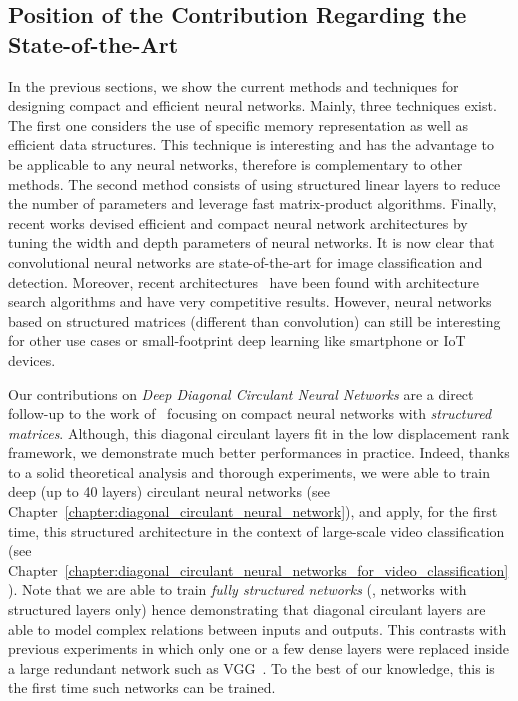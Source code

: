 \subsection{Position of the Contribution Regarding the State-of-the-Art}
\label{subsection:ch3-position_of_the_contribution_regarding_the_state-of-the-art_1}

In the previous sections, we show the current methods and techniques for designing compact and efficient neural networks. 
Mainly, three techniques exist.
The first one considers the use of specific memory representation as well as efficient data structures.
This technique is interesting and has the advantage to be applicable to any neural networks, therefore is complementary to other methods.
The second method consists of using structured linear layers to reduce the number of parameters and leverage fast matrix-product algorithms. 
Finally, recent works devised efficient and compact neural network architectures by tuning the width and depth parameters of neural networks.
It is now clear that convolutional neural networks are state-of-the-art for image classification and detection.
Moreover, recent architectures~\cite{tan2019efficientnet} have been found with architecture search algorithms and have very competitive results. 
However, neural networks based on structured matrices (different than convolution) can still be interesting for other use cases or small-footprint deep learning like smartphone or IoT devices. 

Our contributions on \emph{Deep Diagonal Circulant Neural Networks} are a direct follow-up to the work of~\citet{cheng2015exploration,sindhwani2015structured,moczulski2016acdc,thomas2018learning} focusing on compact neural networks with \emph{structured matrices}.
Although, this diagonal circulant layers fit in the low displacement rank framework, we demonstrate much better performances in practice.
Indeed, thanks to a solid theoretical analysis and thorough experiments, we were able to train deep (up to 40 layers) circulant neural networks (see Chapter~\ref{chapter:diagonal_circulant_neural_network}), and apply, for the first time, this structured architecture in the context of large-scale video classification (see Chapter~\ref{chapter:diagonal_circulant_neural_networks_for_video_classification}).
Note that we are able to train \emph{fully structured networks} (\ie, networks with structured layers only) hence demonstrating that diagonal circulant layers are able to model complex relations between inputs and outputs.
This contrasts with previous experiments in which only one or a few dense layers were replaced inside a large redundant network such as VGG~\cite{simonyan2014very}.
To the best of our knowledge, this is the first time such networks can be trained.  






